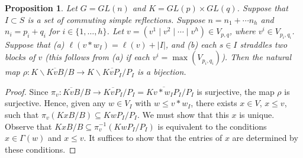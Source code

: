 \documentclass[11pt,letterpaper,reqno]{amsart}
\numberwithin{equation}{section}
\theoremstyle{plain}
\newtheorem{proposition}[theorem]{Proposition}
\theoremstyle{definition}
\theoremstyle{remark}
\begin{document}
\begin{proposition} \label{p:orbitnumber}
 Let $G = GL(n)$ and $K = GL(p) \times GL(q)$.  
Suppose that $I \subset S$ is a set of commuting simple reflections. 
Suppose $n = n_1 + \cdots n_h$ and $n_i = p_i + q_i$ for
$i \in \{1, \ldots, h \}$.  Let 
$v = (v^1 \mid v^2 \mid \cdots \mid v^h) \in V_{p,q}$,
where $v^i \in V_{p_i, q_i}$.   Suppose that 
(a) $\ell(v*w_I)=\ell(v)+ | I |$,  and (b) each $s \in I$ straddles two blocks of $v$ (this follows from (a)
if each $v^i = \max(V_{p_i, q_i})$).  
Then the natural map $\rho: K \backslash \overline{KvB}/B \rightarrow K \backslash \overline{KvP_I}/P_I$
is a bijection.
\end{proposition}
\begin{proof}
Since $\pi_v:  \overline{KvB}/B \rightarrow   \overline{KvP_I}/P_I =  \overline{Kv * w_I P_I}/P_I $ is surjective, the map $\rho$
is surjective.  Hence, given any $w \in V_I$ with
$w \leq v * w_I$, there exists $x \in V$, $x \leq v$, such that $\pi_v(K x B/B) \subseteq K w P_I/P_I$.  
We must show that this $x$ is unique.  Observe that  $K x B/B \subseteq \pi_v^{-1}(K w P_I/P_I)$
is equivalent to the conditions $x \in \Gamma(w)$ and $x \leq v$.
It suffices to show that
the entries of $x$ are determined by these conditions.  


\end{proof}
\end{document}
